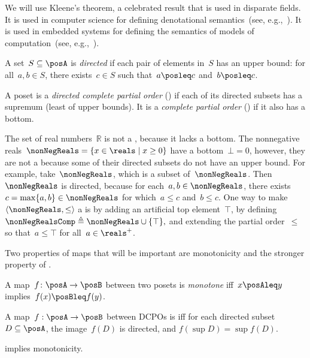 We will use Kleene's theorem, a celebrated result that is used in
disparate fields. It is used in computer science for defining denotational
semantics~(see, e.g.,~\cite{manes86}). It is used in embedded systems
for defining the semantics of models of computation~(see, e.g.,~\cite{lee10}).

\begin{defn}
A set~$S\subseteq\posA$ is \emph{directed} if each pair of elements
in~$S$ has an upper bound: for all~$a,b\in S$, there exists~$c\in S$
such that~$a\posleq c$ and~$b\posleq c$. 
\end{defn}

\begin{defn}[Completeness]
\label{def:cpo}A poset is a \emph{directed complete partial order}
(\DCPO) if each of its directed subsets has a supremum (least of
upper bounds). It is a \emph{complete partial order} (\CPO) if it
also has a bottom.

\end{defn}
\begin{example}
\label{exa:Rcomp}The set of real numbers~$\mathbb{R}$ is not
a \CPO, because it lacks a bottom. The nonnegative reals~$\nonNegReals=\{x\in\reals\mid x\geq0\}$
have a bottom~$\bot=0$, however, they are not a \DCPO because some
of their directed subsets do not have an upper bound. For example,
take~$\nonNegReals$, which is a subset of~$\nonNegReals$. Then~$\nonNegReals$
is directed, because for each~$a,b\in\nonNegReals$, there exists~$c=\max\{a,b\}\in\nonNegReals$
for which~$a\leq c$ and~$b\leq c$. One way to make~$\left\langle \nonNegReals,\leq\right\rangle $
a \CPO is by adding an artificial top element~$\top$, by defining~$\nonNegRealsComp\triangleq\nonNegReals\cup\{\top\},$
and extending the partial order~$\leq$ so that~$a\leq\top$ for
all~$a\in\reals^{+}$. 
\end{example}

Two properties of maps that will be important are monotonicity and
the stronger property of \scottcontinuity.
\begin{defn}[Monotonicity]
\label{def:monotone}A map~$f\colon\posA\rightarrow\posB$ between
two posets is \emph{monotone} iff~$x\posAleq y$ implies~$f(x)\posBleq f(y)$. 
\end{defn}

\begin{defn}[\scottcontinuity]
\label{def:scott}A map~$f:\posA\rightarrow\posB$ between DCPOs
is\textbf{ }\emph{\scottcontinuous{}}\textbf{ }iff for each directed
subset~$D\subseteq\posA$, the image~$f(D)$ is directed, and $f(\sup D)=\sup f(D).$
\end{defn}
\begin{rem}
\scottcontinuity implies monotonicity.
\end{rem}

